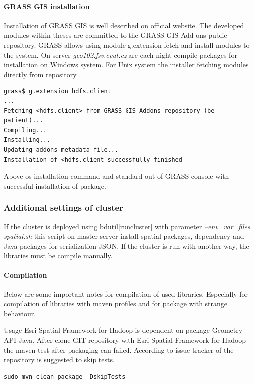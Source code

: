 \documentclass[a4paper,12pt,oneside]{report}
\begin{document}
	\paragraph{GRASS GIS installation}
	Installation of GRASS GIS is well described on official website. The developed
	modules within theses are committed to the GRASS GIS Add-ons public repository.
	GRASS allows using module g.extension fetch and install modules to the system.
	On server \textit{geo102.fsv.cvut.cz} are each night compile packages for
	installation on Windows system. For Unix system the installer  fetching modules directly from repository. 
	\begin{footnotesize}
		\begin{lstlisting}[style=python]
grass$ g.extension hdfs.client
...
Fetching <hdfs.client> from GRASS GIS Addons repository (be patient)...
Compiling...
Installing...
Updating addons metadata file...
Installation of <hdfs.client successfully finished
		\end{lstlisting}
	\end{footnotesize}
	Above os installation command and standard out of GRASS console with successful
	installation of package. 
	
	\subsubsection{Additional settings of cluster}
	If the cluster is deployed using bdutil\ref{runcluster}  with parameter
	\textit{--env\_var\_files spatial.sh} this script on master server install
	spatial packages, dependency and Java packages for serialization JSON. If the
	cluster is run with another way, the libraries must be compile manually.
	
	\paragraph{Compilation} Below are some important notes for compilation of used
	libraries. Especially for compilation of libraries with maven profiles and for
	package with strange behaviour. 
	
	Usage Esri Spatial Framework for Hadoop is dependent on package Geometry API
	Java. After clone GIT repository with Esri Spatial Framework for Hadoop the
	maven test after packaging can failed. According to issue tracker of the
	repository is suggested to skip tests.
	\begin{footnotesize}
		\begin{lstlisting}[style=python]
sudo mvn clean package -DskipTests 
		\end{lstlisting}
	\end{footnotesize}
	
\end{document}
